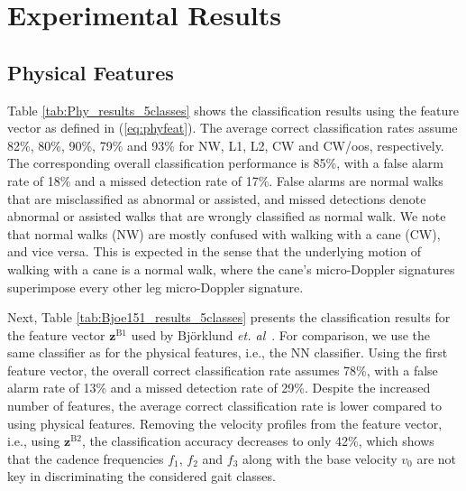 \section{Experimental Results}\label{sec:results}

\subsection{Physical Features}
Table \ref{tab:Phy_results_5classes} shows the classification results using the feature vector as defined in (\ref{eq:phyfeat}). The average correct classification rates assume 82\%, 80\%, 90\%, 79\% and 93\% for NW, L1, L2, CW and CW/oos, respectively. The corresponding overall classification performance is 85\%, with a false alarm rate of 18\% and a missed detection rate of 17\%. False alarms are normal walks that are misclassified as abnormal or assisted, and missed detections denote abnormal or assisted walks that are wrongly classified as normal walk. We note that normal walks (NW) are mostly confused with walking with a cane (CW), and vice versa. This is expected in the sense that the underlying motion of walking with a cane is a normal walk, where the cane's micro-Doppler signatures superimpose every other leg micro-Doppler signature.

Next, Table \ref{tab:Bjoe151_results_5classes} presents the classification results for the feature vector $\mathbf{z}^{\text{B1}}$ used by Bj{\"o}rklund \textit{et. al}~\cite{Bjoe15}. For comparison, we use the same classifier as for the physical features, i.e., the NN classifier. Using the first feature vector, the overall correct classification rate assumes 78\%, with a false alarm rate of 13\% and a missed detection rate of 29\%. Despite the increased number of features, the average correct classification rate is lower compared to using physical features. Removing the velocity profiles from the feature vector, i.e., using $\mathbf{z}^{\text{B2}}$, the classification accuracy decreases to only 42\%, which shows that the cadence frequencies $f_1$, $f_2$ and $f_3$ along with the base velocity $v_0$ are not key in discriminating the considered gait classes.

